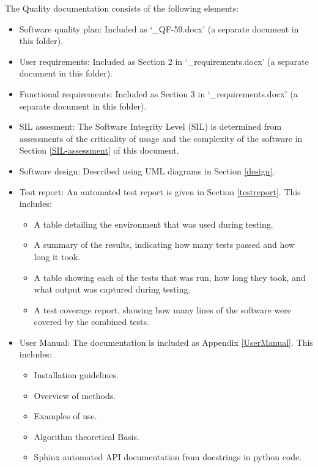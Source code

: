 \documentclass{article}
\begin{document}
The Quality documentation consists of the following elements:
\begin{itemize}
\item Software quality plan: Included as `\packagename\_QF-59.docx' (a separate document in this folder).

\item User requirements: Included as Section 2 in `\packagename\_requirements.docx' (a separate document in this folder).

\item Functional requirements: Included as Section 3 in `\packagename\_requirements.docx' (a separate document in this folder).

\item SIL assesment: The Software Integrity Level (SIL) is determined from assessments of the criticality of usage and the complexity of the software in Section \ref{SIL-assessment} of this document.

\item Software design: Described using UML diagrams in Section \ref{design}.

\item Test report: An automated test report is given in Section \ref{testreport}. This includes:
\begin{itemize}
\item A table detailing the environment that was used during testing.
\item A summary of the results, indicating how many tests passed and how long it took.
\item A table showing each of the tests that was run, how long they took, and what output was captured during testing.
\item A test coverage report, showing how many lines of the software were covered by the combined tests.
\end{itemize}
\item User Manual: The \packagename documentation is included as Appendix \ref{UserManual}. This includes:
\begin{itemize}
\item Installation guidelines.
\item Overview of methods.
\item Examples of use.
\item Algorithm theoretical Basis.
\item Sphinx automated API documentation from docstrings in python code.
\end{itemize}
\end{itemize}
\end{document}
